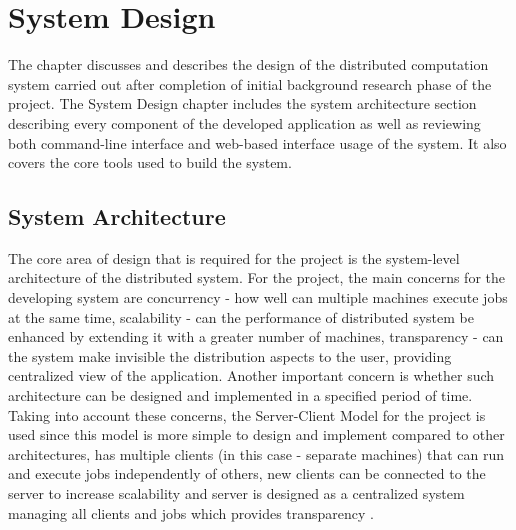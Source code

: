 \documentclass[10pt]{report}
\begin{document}
\chapter{System Design}

The chapter discusses and describes the design of the distributed computation system carried out after completion of initial background research phase of the project. The System Design chapter includes the system architecture section describing every component of the developed application as well as reviewing both command-line interface and web-based interface usage of the system. It also covers the core tools used to build the system.

\section{System Architecture}

The core area of design that is required for the project is the system-level architecture of the distributed system. For the project, the main concerns for the developing system are concurrency - how well can multiple machines execute jobs at the same time, scalability - can the performance of distributed system be enhanced by extending it with a greater number of machines, transparency - can the system make invisible the distribution aspects to the user, providing centralized view of the application. Another important concern is whether such architecture can be designed and implemented in a specified period of time. Taking into account these concerns, the Server-Client Model for the project is used since this model is more simple to design and implement compared to other architectures, has multiple clients (in this case - separate machines) that can run and execute jobs independently of others, new clients can be connected to the server to increase scalability and server is designed as a centralized system managing all clients and jobs which provides transparency \cite{clientserver}.
\newline
\end{document}
